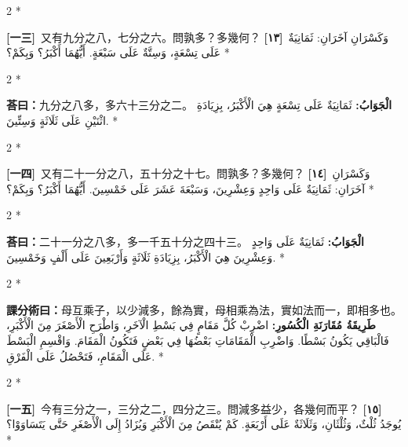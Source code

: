 \documentclass[11pt,a4paper]{article}
\newcommand{\ar}[1]{\arabicfont\beginR #1\endR}
\newcommand{\problemnum}[1]{\textbf{[\ignorespaces#1\unskip]}}
\newenvironment{bilingual}{%
  \begin{paracol}{2}%
  \switchcolumn[0]*%
}{%
  \end{paracol}%
}
\newcommand{\cnline}[1]{\switchcolumn[0]\noindent #1 \switchcolumn[1]}
\newcommand{\arline}[1]{\noindent\ar{#1} \switchcolumn[0]*}
\newenvironment{prob bilingual}{%
  \begin{paracol}{2}%
  \switchcolumn[0]*%
}{%
  \end{paracol}%
  \vspace{0.3em}%
}
\begin{document}
\begin{bilingual}
\cnline{\problemnum{一三}\, 又有九分之八，七分之六。問孰多？多幾何？}
\arline{\problemnum{١٣}\, وَكَسْرَانِ آخَرَانِ: ثَمَانِيَةٌ عَلَى تِسْعَةٍ، وَسِتَّةٌ عَلَى سَبْعَةٍ. أَيُّهُمَا أَكْبَرُ؟ وَبِكَمْ؟}
\end{bilingual}

\begin{bilingual}
\cnline{\textcolor{answercolor}{\textbf{荅曰：}}九分之八多，多六十三分之二。}
\arline{\textcolor{answercolor}{\textbf{الْجَوَابُ:}} ثَمَانِيَةٌ عَلَى تِسْعَةٍ هِيَ الْأَكْبَرُ، بِزِيَادَةِ اثْنَيْنِ عَلَى ثَلَاثَةٍ وَسِتِّينَ.}
\end{bilingual}

\begin{bilingual}
\cnline{\problemnum{一四}\, 又有二十一分之八，五十分之十七。問孰多？多幾何？}
\arline{\problemnum{١٤}\, وَكَسْرَانِ آخَرَانِ: ثَمَانِيَةٌ عَلَى وَاحِدٍ وَعِشْرِينَ، وَسَبْعَةَ عَشَرَ عَلَى خَمْسِينَ. أَيُّهُمَا أَكْبَرُ؟ وَبِكَمْ؟}
\end{bilingual}

\begin{bilingual}
\cnline{\textcolor{answercolor}{\textbf{荅曰：}}二十一分之八多，多一千五十分之四十三。}
\arline{\textcolor{answercolor}{\textbf{الْجَوَابُ:}} ثَمَانِيَةٌ عَلَى وَاحِدٍ وَعِشْرِينَ هِيَ الْأَكْبَرُ، بِزِيَادَةِ ثَلَاثَةٍ وَأَرْبَعِينَ عَلَى أَلْفٍ وَخَمْسِينَ.}
\end{bilingual}

\begin{bilingual}
\cnline{%
\textcolor{methodcolor}{\textbf{課分術曰：}}母互乘子，以少減多，餘為實，母相乘為法，實如法而一，即相多也。
}
\arline{%
\textcolor{methodcolor}{\textbf{طَرِيقَةُ مُقَارَنَةِ الْكُسُورِ:}} اضْرِبْ كُلَّ مَقَامٍ فِي بَسْطِ الْآخَرِ، وَاطْرَحِ الْأَصْغَرَ مِنَ الْأَكْبَرِ، فَالْبَاقِي يَكُونُ بَسْطًا. وَاضْرِبِ الْمَقَامَاتِ بَعْضُهَا فِي بَعْضٍ فَتَكُونُ الْمَقَامَ. وَاقْسِمِ الْبَسْطَ عَلَى الْمَقَامِ، فَتَحْصُلُ عَلَى الْفَرْقِ.
}
\end{bilingual}

\begin{bilingual}
\cnline{\problemnum{一五}\, 今有三分之一，三分之二，四分之三。問減多益少，各幾何而平？}
\arline{\problemnum{١٥}\, يُوجَدُ ثُلْثٌ، وَثُلْثَانِ، وَثَلَاثَةٌ عَلَى أَرْبَعَةٍ. كَمْ يُنْقَصُ مِنَ الْأَكْبَرِ وَيُزَادُ إِلَى الْأَصْغَرِ حَتَّى يَتَسَاوَوْا؟}
\end{bilingual}
\end{document}
